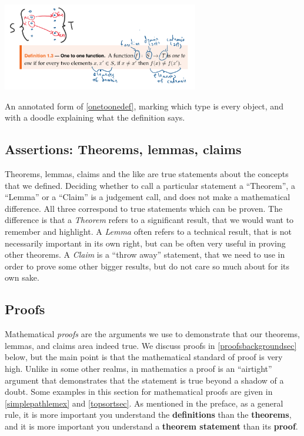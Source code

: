 \begin{marginfigure}
\centering
\includegraphics[width=\linewidth, height=1.5in, keepaspectratio]{../figure/onetoonedef.png}
\caption{An annotated form of \cref{onetoonedef}, marking which type is
every object, and with a doodle explaining what the definition says.}
\label{onetoonedefannotatedef}
\end{marginfigure}

\subsection{Assertions: Theorems, lemmas,
claims}\label{Assertions-Theorems-lemma}

Theorems, lemmas, claims and the like are true statements about the
concepts that we defined. Deciding whether to call a particular
statement a ``Theorem'', a ``Lemma'' or a ``Claim'' is a judgement call,
and does not make a mathematical difference. All three correspond to
true statements which can be proven. The difference is that a
\emph{Theorem} refers to a significant result, that we would want to
remember and highlight. A \emph{Lemma} often refers to a technical
result, that is not necessarily important in its own right, but can be
often very useful in proving other theorems. A \emph{Claim} is a ``throw
away'' statement, that we need to use in order to prove some other
bigger results, but do not care so much about for its own sake.

\subsection{Proofs}\label{Proofs}

Mathematical \emph{proofs} are the arguments we use to demonstrate that
our theorems, lemmas, and claims area indeed true. We discuss proofs in
\cref{proofsbackgroundsec} below, but the main point is that the
mathematical standard of proof is very high. Unlike in some other
realms, in mathematics a proof is an ``airtight'' argument that
demonstrates that the statement is true beyond a shadow of a doubt. Some
examples in this section for mathematical proofs are given in
\cref{simplepathlemex} and \cref{topsortsec}. As mentioned in the
preface, as a general rule, it is more important you understand the
\textbf{definitions} than the \textbf{theorems}, and it is more
important you understand a \textbf{theorem statement} than its
\textbf{proof}.

